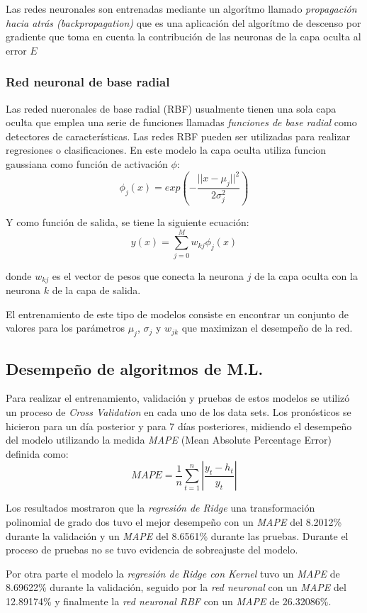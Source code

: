 {Las redes neuronales son entrenadas mediante un algorítmo llamado \emph{propagación hacia atrás (backpropagation)} que es una aplicación del algorítmo de descenso por gradiente que toma en cuenta la contribución de las neuronas de la capa oculta al error $E$

\subsubsection*{Red neuronal de base radial}

Las reded nueronales de base radial (RBF) usualmente tienen una sola capa oculta que emplea una serie de funciones llamadas \emph{funciones de base radial} como detectores de características. Las redes RBF pueden ser utilizadas para realizar regresiones o clasificaciones. En este modelo la capa oculta utiliza funcion gaussiana como función de activación $\phi$: $$\phi_j(x)=exp(-\frac{||x-\mu_j||^2}{2\sigma_j^2})$$

Y como función de salida, se tiene la siguiente ecuación: $$y(x)=\sum_{j=0}^{M} w_{kj} \phi_j(x)$$

donde $w_{kj}$ es el vector de pesos que conecta la neurona $j$ de la capa oculta con la neurona $k$ de la capa de salida.

El entrenamiento de este tipo de modelos consiste en encontrar un conjunto de valores para los parámetros $\mu_j$, $\sigma_j$ y $w_{jk}$ que maximizan el desempeño de la red. 

\subsection*{Desempeño de algoritmos de M.L.}

Para realizar el entrenamiento, validación y pruebas de estos modelos se utilizó un proceso de \emph{Cross Validation} en cada uno de los data sets. Los pronósticos se hicieron para un día posterior y para 7 días posteriores, midiendo el desempeño del modelo utilizando la medida \emph{MAPE} (Mean Absolute Percentage Error) definida como: $$MAPE=\frac{1}{n}\sum_{t=1}^{n}|\frac{y_t-h_t}{y_t}|$$

Los resultados mostraron que la \emph{regresión de Ridge} una transformación polinomial de grado dos tuvo el mejor desempeño con un \emph{MAPE} del 8.2012\% durante la validación y un \emph{MAPE} del 8.6561\% durante las pruebas. Durante el proceso de pruebas no se tuvo evidencia de sobreajuste del modelo.

Por otra parte el modelo la \emph{regresión de Ridge con Kernel} tuvo un \emph{MAPE} de 8.69622\% durante la validación, seguido por la \emph{red neuronal} con un \emph{MAPE} del 12.89174\% y finalmente la \emph{red neuronal RBF} con un \emph{MAPE} de 26.32086\%.

}

